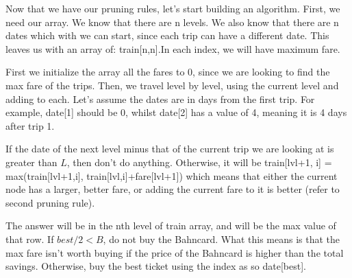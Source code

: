 \documentclass{article}
\begin{document}
\begin{enumerate}
Now that we have our pruning rules, let's start building an algorithm. First, we need our array. We know that there are n levels. We also know that there are n dates which with we can start, since each trip can have a different date. This leaves us with an array of: train[n,n].In each index, we will have maximum fare.

First we initialize the array all the fares to 0, since we are looking to find the max fare of the trips. Then, we travel level by level, using the current level and adding to each. 
Let's assume the dates are in days from the first trip. For example, date[1] should be 0, whilst date[2] has a value of 4, meaning it is 4 days after trip 1. 

If the date of the next level minus that of the current trip we are looking at is greater than $L$, then don't do anything. Otherwise, it will be
train[lvl+1, i] = max(train[lvl+1,i], train[lvl,i]+fare[lvl+1])
which means that either the current node has a larger, better fare, or adding the current fare to it is better (refer to second pruning rule). 

The answer will be in the nth level of train array, and will be the max value of that row. If $best/2 < B$, do not buy the Bahncard. What this means is that the max fare isn't worth buying if the price of the Bahncard is higher than the total savings. Otherwise, buy the best ticket using the index as so date[best].


\end{enumerate}
\end{document}
